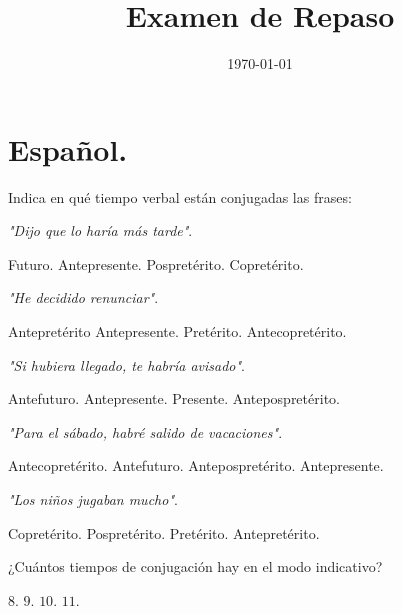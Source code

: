 \documentclass[12pt]{exam}
\title{\vspace*{-2cm}Examen de Repaso\vspace{-5ex}}
\date{\today}
\begin{document}
\maketitle

\section{Español.}

Indica en qué tiempo verbal están conjugadas las frases:
\begin{questions}
    \question \emph{"Dijo que lo haría más tarde"}.
    \\[0.5em]
    \begin{oneparchoices}
        \choice Futuro.
        \choice Antepresente.
        \choice Pospretérito.
        \choice Copretérito.
    \end{oneparchoices}
    \question \emph{"He decidido renunciar"}.
    \\[0.5em]
    \begin{oneparchoices}
        \choice Antepretérito
        \choice Antepresente.
        \choice Pretérito.
        \choice Antecopretérito.
    \end{oneparchoices}
    \question \emph{"Si hubiera llegado, te habría avisado"}.
    \\[0.5em]
    \begin{oneparchoices}
        \choice Antefuturo.
        \choice Antepresente.
        \choice Presente.
        \choice Antepospretérito.
    \end{oneparchoices}
    \question \emph{"Para el sábado, habré salido de vacaciones"}.
    \\[0.5em]
    \begin{oneparchoices}
        \choice Antecopretérito.
        \choice Antefuturo.
        \choice Antepospretérito.
        \choice Antepresente.
    \end{oneparchoices}
    \question \emph{"Los niños jugaban mucho"}.
    \\[0.5em]
    \begin{oneparchoices}
        \choice Copretérito.
        \choice Pospretérito.
        \choice Pretérito.
        \choice Antepretérito.
    \end{oneparchoices}
    \question ¿Cuántos tiempos de conjugación hay en el modo indicativo?
    \\[0.5em]
    \begin{oneparchoices}
        \choice $8$.
        \choice $9$.
        \choice $10$.
        \choice $11$.

\end{oneparchoices}
\end{questions}
\end{document}
